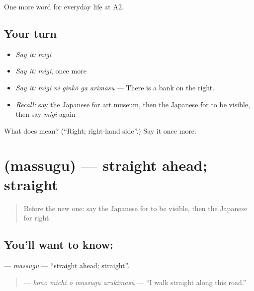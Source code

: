 \begin{grammarlens}[title={What you've built}]
One more word for everyday life at A2.
\end{grammarlens}

\subsection*{Your turn}
\begin{itemize}
\raggedright
  \item \emph{Say it:} \emph{migi}
  \item \emph{Say it:} \emph{migi}, once more
  \item \emph{Say it:} \emph{migi ni ginkō ga arimasu} — There is a bank on the right.
  \item \emph{Recall:} say the Japanese for art museum, then the Japanese for to be visible, then say \emph{migi} again
\end{itemize}

\begin{tcolorbox}[breakable,colback=teal!4,colframe=teal!35!black,title={Before you move on}]
What does  mean? (\textquotedblleft{}Right; right-hand side\textquotedblright{}.) Say it once more.
\end{tcolorbox}
\section[\texorpdfstring{\ja{まっすぐ} (massugu)}{まっすぐ (massugu)}]{ (massugu) — straight ahead; straight}

\label{lesson:JA-C194-massugu}



\begin{quote}
Before the new one: say the Japanese for to be visible, then the Japanese for right.
\end{quote}

\subsection*{You'll want to know: }
\textbf{} — \emph{massugu} — \textquotedblleft{}straight ahead; straight\textquotedblright{}.

\begin{quote}
\textbf{   } — \emph{kono michi o massugu arukimasu} — \textquotedblleft{}I walk straight along this road.\textquotedblright{}
\end{quote}

